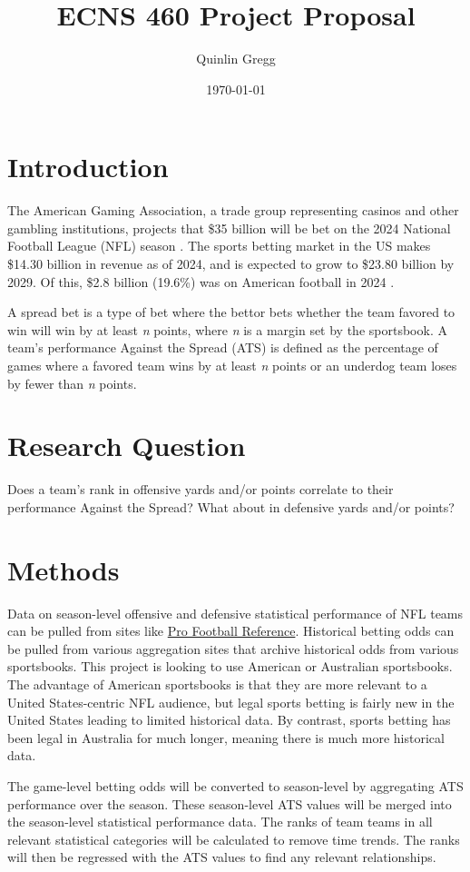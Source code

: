 \documentclass{article}
\title{ECNS 460 Project Proposal}
\author{Quinlin Gregg}
\date{\today}
\begin{document}
\maketitle

\section{Introduction}
The American Gaming Association, a trade group representing casinos and other gambling institutions,
projects that \$35 billion will be bet on the 2024 National Football League (NFL) season \cite{nflbettingamount}.
The sports betting market in the US makes \$14.30 billion in revenue as of 2024,
and is expected to grow to \$23.80 billion by 2029.
Of this, \$2.8 billion (19.6\%) was on American football in 2024 \cite{sportsbettingmarketsize}.

A spread bet is a type of bet where the bettor bets whether the team favored to win will win by at least
\textit{n} points, where \textit{n} is a margin set by the sportsbook. A team's performance Against the
Spread (ATS) is defined as the percentage of games where a favored team wins by at least \textit{n}
points or an underdog team loses by fewer than \textit{n} points.

\section{Research Question}
Does a team's rank in offensive yards and/or points correlate to their performance Against the Spread?
What about in defensive yards and/or points?

\section{Methods}
Data on season-level offensive and defensive statistical performance of NFL teams can be pulled
from sites like \href{https://www.pro-football-reference.com}{Pro Football Reference}.
Historical betting odds can be pulled from various aggregation sites that archive historical odds
from various sportsbooks. This project is looking to use American or Australian sportsbooks.
The advantage of American sportsbooks is that they are more relevant to a United States-centric
NFL audience, but legal sports betting is fairly new in the United States leading to limited historical
data. By contrast, sports betting has been legal in Australia for much longer, meaning there is
much more historical data.

The game-level betting odds will be converted
to season-level by aggregating ATS performance over the season. These season-level ATS values will be
merged into the season-level statistical performance data. The ranks of team teams in all relevant
statistical categories will be calculated to remove time trends. The ranks will then be regressed
with the ATS values to find any relevant relationships.
\end{document}

